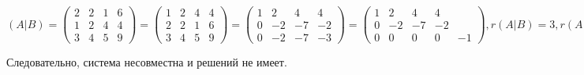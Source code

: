 \documentclass{article}
\begin{document}
$(A|B) = \begin{pmatrix}
    2 & 2 & 1 & 6 \\
    1 & 2 & 4 & 4 \\
    3 & 4 & 5 & 9
\end{pmatrix} = \begin{pmatrix}
    1 & 2 & 4 & 4 \\
    2 & 2 & 1 & 6 \\
    3 & 4 & 5 & 9
\end{pmatrix} = \begin{pmatrix}
    1 & 2 & 4 & 4 \\
    0 & -2 & -7 & -2 \\
    0 & -2 & -7 & -3
\end{pmatrix} = \begin{pmatrix}
    1 & 2 & 4 & 4 \\
    0 & -2 & -7 & -2 \\
    0 & 0 & 0 & 0 & -1
\end{pmatrix}, r(A|B) = 3, r(A) = 2$

Следовательно, система несовместна и решений не имеет.
\end{document}
